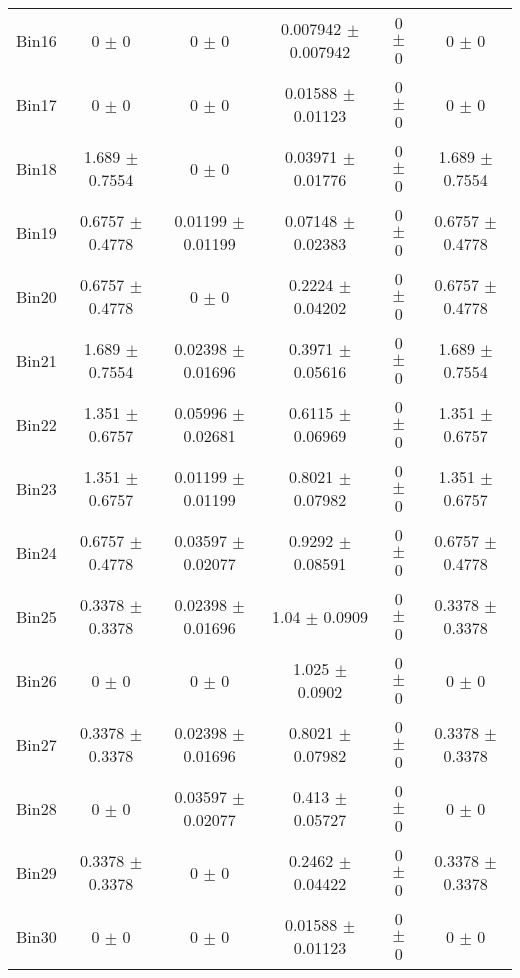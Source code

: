 \begin{tabular}{@{\extracolsep{4pt}}lccccc@{}}
     Bin16 & 0 $\pm$ 0 & 0 $\pm$ 0 & 0.007942 $\pm$ 0.007942 & 0 $\pm$ 0 & 0 $\pm$ 0 \\ 
     Bin17 & 0 $\pm$ 0 & 0 $\pm$ 0 & 0.01588 $\pm$ 0.01123 & 0 $\pm$ 0 & 0 $\pm$ 0 \\ 
     Bin18 & 1.689 $\pm$ 0.7554 & 0 $\pm$ 0 & 0.03971 $\pm$ 0.01776 & 0 $\pm$ 0 & 1.689 $\pm$ 0.7554 \\ 
     Bin19 & 0.6757 $\pm$ 0.4778 & 0.01199 $\pm$ 0.01199 & 0.07148 $\pm$ 0.02383 & 0 $\pm$ 0 & 0.6757 $\pm$ 0.4778 \\ 
     Bin20 & 0.6757 $\pm$ 0.4778 & 0 $\pm$ 0 & 0.2224 $\pm$ 0.04202 & 0 $\pm$ 0 & 0.6757 $\pm$ 0.4778 \\ 
     Bin21 & 1.689 $\pm$ 0.7554 & 0.02398 $\pm$ 0.01696 & 0.3971 $\pm$ 0.05616 & 0 $\pm$ 0 & 1.689 $\pm$ 0.7554 \\ 
     Bin22 & 1.351 $\pm$ 0.6757 & 0.05996 $\pm$ 0.02681 & 0.6115 $\pm$ 0.06969 & 0 $\pm$ 0 & 1.351 $\pm$ 0.6757 \\ 
     Bin23 & 1.351 $\pm$ 0.6757 & 0.01199 $\pm$ 0.01199 & 0.8021 $\pm$ 0.07982 & 0 $\pm$ 0 & 1.351 $\pm$ 0.6757 \\ 
     Bin24 & 0.6757 $\pm$ 0.4778 & 0.03597 $\pm$ 0.02077 & 0.9292 $\pm$ 0.08591 & 0 $\pm$ 0 & 0.6757 $\pm$ 0.4778 \\ 
     Bin25 & 0.3378 $\pm$ 0.3378 & 0.02398 $\pm$ 0.01696 & 1.04 $\pm$ 0.0909 & 0 $\pm$ 0 & 0.3378 $\pm$ 0.3378 \\ 
     Bin26 & 0 $\pm$ 0 & 0 $\pm$ 0 & 1.025 $\pm$ 0.0902 & 0 $\pm$ 0 & 0 $\pm$ 0 \\ 
     Bin27 & 0.3378 $\pm$ 0.3378 & 0.02398 $\pm$ 0.01696 & 0.8021 $\pm$ 0.07982 & 0 $\pm$ 0 & 0.3378 $\pm$ 0.3378 \\ 
     Bin28 & 0 $\pm$ 0 & 0.03597 $\pm$ 0.02077 & 0.413 $\pm$ 0.05727 & 0 $\pm$ 0 & 0 $\pm$ 0 \\ 
     Bin29 & 0.3378 $\pm$ 0.3378 & 0 $\pm$ 0 & 0.2462 $\pm$ 0.04422 & 0 $\pm$ 0 & 0.3378 $\pm$ 0.3378 \\ 
     Bin30 & 0 $\pm$ 0 & 0 $\pm$ 0 & 0.01588 $\pm$ 0.01123 & 0 $\pm$ 0 & 0 $\pm$ 0 \\ 
\hline\hline
  \end{tabular}
